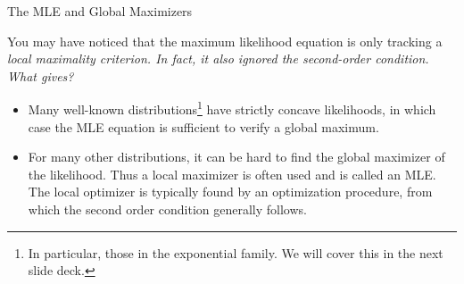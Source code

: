 \documentclass[10pt]{beamer}
\begin{document}
\begin{frame}{The MLE and Global Maximizers}

You may have noticed that the maximum likelihood equation is only tracking a \it{local} maximality criterion.  In fact, it also ignored the second-order condition. What gives?

\begin{itemize}
\item Many well-known distributions\footnote{In particular, those in the exponential family.  We will cover this in the next slide deck.} have strictly concave likelihoods, in which case the MLE equation is sufficient to verify a global maximum. 
\item For many other distributions, it can be hard to find the global maximizer of the likelihood. Thus a local maximizer is often used and is called an MLE.   The local optimizer is typically found by an optimization procedure, from which the second order condition generally follows.
\end{itemize}

\end{frame}
\end{document}
